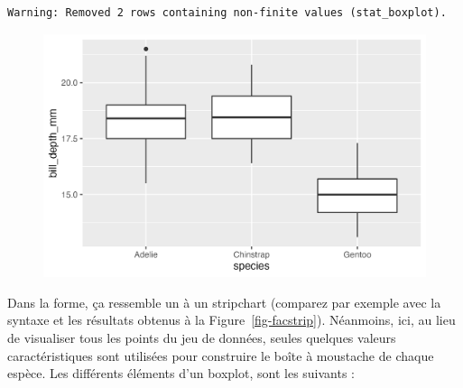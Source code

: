 \documentclass[
  letterpaper,
  DIV=11,
  numbers=noendperiod]{scrreprt}
\begin{document}
\begin{verbatim}
Warning: Removed 2 rows containing non-finite values (stat_boxplot).
\end{verbatim}

\begin{figure}[H]

{\centering \includegraphics{./03-visualization_files/figure-pdf/unnamed-chunk-72-1.png}

}

\end{figure}

Dans la forme, ça ressemble un à un stripchart (comparez par exemple
avec la syntaxe et les résultats obtenus à la
Figure~\ref{fig-facstrip}). Néanmoins, ici, au lieu de visualiser tous
les points du jeu de données, seules quelques valeurs caractéristiques
sont utilisées pour construire le boîte à moustache de chaque espèce.
Les différents éléments d'un boxplot, sont les suivants :
\end{document}
